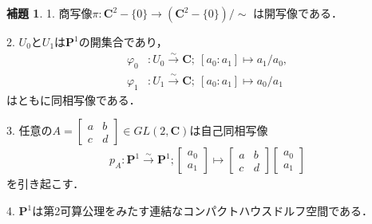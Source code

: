 \documentclass[11pt, a4paper, dvipdfmx]{jsarticle}
\theoremstyle{definition}
\newtheorem{Lemma}[Axiom]{補題}
\newcommand{\cc}{\mathbf{C}}
\newcommand{\pp}{\mathbf{P}}
\newcommand{\dip}{\displaystyle} %
\newcommand{\pphi}{\varphi} %
\theoremstyle{mystyle}
\numberwithin{equation}{section} %
\begin{document}
\begin{Lemma}\label{mnf:p1}
    1. 
    商写像$\pi \colon \cc^{2}-\{0\}
    \longrightarrow\left(\cc^{2}-\{0\}\right)/{\sim}$
    は開写像である．

    2. 
    $U_0$と$U_1$は$\pp^1$の開集合であり，
    \begin{align*}
        \pphi_0&\colon U_0\overset{{\sim}}{\longrightarrow}\cc;\ [a_0\colon a_1]\mapsto a_1/a_0,\\
        \pphi_1&\colon U_1\overset{{\sim}}{\longrightarrow}\cc;\ [a_0\colon a_1]\mapsto a_0/a_1
    \end{align*}
    はともに同相写像である．

    3. 
    任意の$\dip A = \begin{bmatrix}
        a&b\\c&d
    \end{bmatrix}\in GL(2,\cc)$は自己同相写像
    \begin{align*}
        p_A\colon \pp^1\overset{{\sim}}{\longrightarrow}\pp^1;
        \begin{bmatrix}
            a_0\\a_1
        \end{bmatrix}
        \mapsto
        \begin{bmatrix}
            a&b\\c&d
        \end{bmatrix}
        \begin{bmatrix}
            a_0\\a_1
        \end{bmatrix}
    \end{align*}
    を引き起こす．

    4. 
    $\pp^1$は第2可算公理をみたす連結なコンパクトハウスドルフ空間である．
\end{Lemma}
\end{document}
